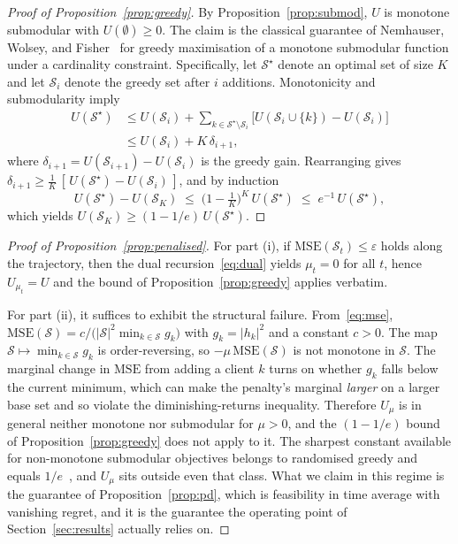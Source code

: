 \documentclass[lettersize,journal]{IEEEtran}
\newcommand{\calS}{\mathcal{S}}
\begin{document}
\begin{proof}[Proof of Proposition~\ref{prop:greedy}]
By Proposition~\ref{prop:submod}, $U$ is monotone submodular with $U(\emptyset)\ge 0$. The claim is the classical guarantee of Nemhauser, Wolsey, and Fisher~\cite{nemhauser1978} for greedy maximisation of a monotone submodular function under a cardinality constraint. Specifically, let $\calS^\star$ denote an optimal set of size $K$ and let $\calS_i$ denote the greedy set after $i$ additions. Monotonicity and submodularity imply
\begin{align*}
U(\calS^\star)&\le U(\calS_i)+\sum_{k\in\calS^\star\setminus\calS_i}\big[U(\calS_i\cup\{k\})-U(\calS_i)\big]\\
&\le U(\calS_i)+K\,\delta_{i+1},
\end{align*}
where $\delta_{i+1}=U(\calS_{i+1})-U(\calS_i)$ is the greedy gain. Rearranging gives $\delta_{i+1}\ge\frac{1}{K}\,[\,U(\calS^\star)-U(\calS_i)\,]$, and by induction
\[
U(\calS^\star)-U(\calS_K)\;\le\;\Big(1-\tfrac{1}{K}\Big)^{K}\,U(\calS^\star)\;\le\;e^{-1}\,U(\calS^\star),
\]
which yields $U(\calS_K)\ge(1-1/e)\,U(\calS^\star)$.
\end{proof}

\begin{proof}[Proof of Proposition~\ref{prop:penalised}]
For part (i), if $\mathrm{MSE}(\calS_t)\le\varepsilon$ holds along the trajectory, then the dual recursion~\eqref{eq:dual} yields $\mu_t=0$ for all $t$, hence $U_{\mu_t}=U$ and the bound of Proposition~\ref{prop:greedy} applies verbatim.

For part (ii), it suffices to exhibit the structural failure. From~\eqref{eq:mse}, $\mathrm{MSE}(\calS)=c/\big(|\calS|^2\min_{k\in\calS}g_k\big)$ with $g_k=|h_k|^2$ and a constant $c>0$. The map $\calS\mapsto\min_{k\in\calS}g_k$ is order-reversing, so $-\mu\,\mathrm{MSE}(\calS)$ is not monotone in $\calS$. The marginal change in $\mathrm{MSE}$ from adding a client $k$ turns on whether $g_k$ falls below the current minimum, which can make the penalty's marginal \emph{larger} on a larger base set and so violate the diminishing-returns inequality. Therefore $U_\mu$ is in general neither monotone nor submodular for $\mu>0$, and the $(1-1/e)$ bound of Proposition~\ref{prop:greedy} does not apply to it. The sharpest constant available for non-monotone submodular objectives belongs to randomised greedy and equals $1/e$~\cite{buchbinder2014}, and $U_\mu$ sits outside even that class. What we claim in this regime is the guarantee of Proposition~\ref{prop:pd}, which is feasibility in time average with vanishing regret, and it is the guarantee the operating point of Section~\ref{sec:results} actually relies on.
\end{proof}
\end{document}
